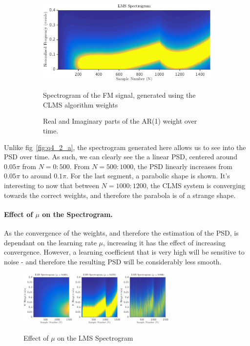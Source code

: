 \documentclass[main.tex]{subfiles}
\begin{document}
\begin{figure}[H]
	\centering
	\begin{subfigure}[b]{0.7\textwidth}
		\includegraphics[width=\textwidth]{images/4-2-b-1.png}
		\label{fig:4-2-b-1}
		\caption{Spectrogram of the FM signal, generated using the CLMS algorithm weights}
	\end{subfigure}%
	
	\begin{subfigure}[b]{0.7\textwidth}
		\resizebox{\textwidth}{!}{}
		\label{fig:4-2-b-2}
		\caption{Real and Imaginary parts of the AR(1) weight over time.}
	\end{subfigure}
	\caption{}
	\label{fig:4-2-b}
\end{figure}

Unlike fig~\ref{fig:q4_2_a}, the spectrogram generated here allows us to see into the PSD over time. As such, we can clearly see the a linear PSD, centered around $0.05\pi$ from $N=0:500$. From $N=500:1000$, the PSD linearly increases from $0.05\pi$ to around $0.1\pi$. For the last segment, a parabolic shape is shown. It's interesting to now that between $N=1000:1200$, the CLMS system is converging towards the correct weights, and therefore the parabola is of a strange shape. 

\paragraph{Effect of $\mu$ on the Spectrogram.} As the convergence of the weights, and therefore the estimation of the PSD, is dependant on the learning rate $\mu$, increasing it has the effect of increasing convergence. However, a learning coefficient that is very high will be sensitive to noise - and therefore the resulting PSD will be considerably less smooth.


\begin{figure}[H]
	\centering
	\includegraphics[width=0.7\textwidth]{images/4-2-b-3.png}
	\label{fig:4-2-b-3}
	\caption{Effect of $\mu$ on the LMS Spectrogram}
\end{figure}%
\end{document}
